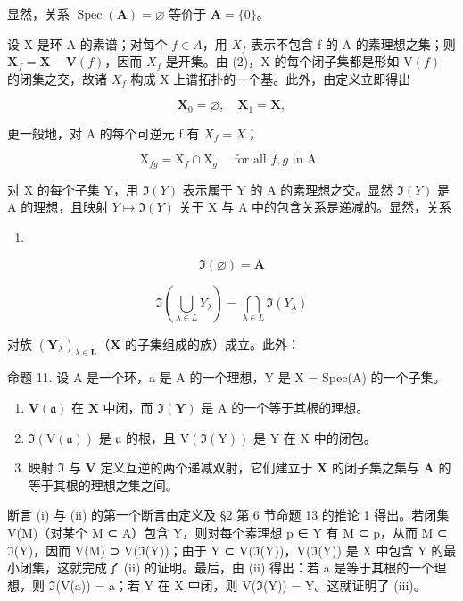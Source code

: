 显然，关系 \(\operatorname{Spec}(\mathbf{A}) = \varnothing\) 等价于 \(\mathbf{A} = \{0\}\)。

设 X 是环 A 的素谱；对每个 \(f \in A\)，用 \(X_{f}\) 表示不包含 f 的 A 的素理想之集；则 \(\mathbf{X}_{f} = \mathbf{X} - \mathbf{V}(f)\)，因而 \(X_{f}\) 是开集。由 (2)，X 的每个闭子集都是形如 \(\mathrm{V}(f)\) 的闭集之交，故诸 \(X_{f}\) 构成 X 上谱拓扑的一个基。此外，由定义立即得出

\[
\mathbf {X} _ {0} = \varnothing , \quad \mathbf {X} _ {1} = \mathbf {X},\tag{5}
\]

更一般地，对 A 的每个可逆元 f 有 \(X_{f} = X\)；

\[
\mathrm{X} _ {f g} = \mathrm{X} _ {f} \cap \mathrm{X} _ {g} \quad \text {   for   all   } f, g \text {   in   A.   }\tag{6}
\]

对 X 的每个子集 Y，用 \(\Im(Y)\) 表示属于 Y 的 A 的素理想之交。显然 \(\Im(Y)\) 是 A 的理想，且映射 \(Y \mapsto \Im(Y)\) 关于 X 与 A 中的包含关系是递减的。显然，关系

\begin{enumerate}
\def\labelenumi{(\arabic{enumi})}
\setcounter{enumi}{6}
\tightlist
\item
\end{enumerate}

\[
\Im (\varnothing) = \mathbf {A}\tag{7}
\]

\[
\Im \left(\bigcup_ {\lambda \in L} Y _ {\lambda}\right) = \bigcap_ {\lambda \in L} \Im (Y _ {\lambda})\tag{8}
\]

对族 \((\mathbf{Y}_{\lambda})_{\lambda \in \mathbf{L}}\)（\(\mathbf{X}\) 的子集组成的族）成立。此外：

命题 11. 设 A 是一个环，a 是 A 的一个理想，Y 是 X = Spec(A) 的一个子集。

\begin{enumerate}
\def\labelenumi{(\roman{enumi})}
\item
  \(\mathbf{V}(\mathfrak{a})\) 在 \(\mathbf{X}\) 中闭，而 \(\Im (\mathbf{Y})\) 是 A 的一个等于其根的理想。
\item
  \(\Im(\mathrm{V}(\mathfrak{a}))\) 是 \(\mathfrak{a}\) 的根，且 \(\mathrm{V}(\Im(\mathrm{Y}))\) 是 \(\mathrm{Y}\) 在 \(\mathrm{X}\) 中的闭包。
\item
  映射 \(\Im\) 与 \(\mathbf{V}\) 定义互逆的两个递减双射，它们建立于 \(\mathbf{X}\) 的闭子集之集与 \(\mathbf{A}\) 的等于其根的理想之集之间。
\end{enumerate}

断言 (i) 与 (ii) 的第一个断言由定义及 §2 第 6 节命题 13 的推论 1 得出。若闭集 V(M)（对某个 M ⊂ A）包含 Y，则对每个素理想 p ∈ Y 有 M ⊂ p，从而 M ⊂ \(\mathfrak{I}\)(Y)，因而 V(M) ⊃ V(\(\mathfrak{I}\)(Y))；由于 Y ⊂ V(\(\mathfrak{I}\)(Y))，V(\(\mathfrak{I}\)(Y)) 是 X 中包含 Y 的最小闭集，这就完成了 (ii) 的证明。最后，由 (ii) 得出：若 a 是等于其根的一个理想，则 \(\mathfrak{I}\)(V(a)) = a；若 Y 在 X 中闭，则 V(\(\mathfrak{I}\)(Y)) = Y。这就证明了 (iii)。

